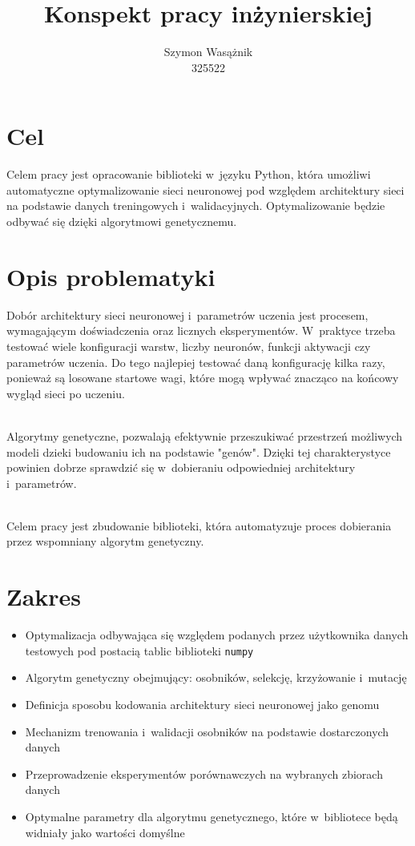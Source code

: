 \documentclass[a4paper, 11pt]{article}
\title{Konspekt pracy inżynierskiej}
\author{Szymon Wasążnik\\325522}
\date{}
\begin{document}
\maketitle
\section{Cel}
Celem pracy jest opracowanie biblioteki w~języku Python,
która umożliwi automatyczne optymalizowanie sieci neuronowej
pod względem architektury sieci na podstawie danych treningowych i~walidacyjnych.
Optymalizowanie będzie odbywać się dzięki algorytmowi genetycznemu.

\section{Opis problematyki}
Dobór architektury sieci neuronowej i~parametrów uczenia jest procesem,
wymagającym doświadczenia oraz licznych eksperymentów.
W~praktyce trzeba testować wiele konfiguracji warstw,
liczby neuronów, funkcji aktywacji czy parametrów uczenia.
Do tego najlepiej testować daną konfigurację kilka razy,
ponieważ są losowane startowe wagi,
które mogą wpływać znacząco na końcowy wygląd sieci po uczeniu.

\noindent\\
Algorytmy genetyczne, pozwalają efektywnie przeszukiwać przestrzeń możliwych modeli
dzieki budowaniu ich na podstawie "genów".
Dzięki tej charakterystyce powinien dobrze sprawdzić się w~dobieraniu odpowiedniej architektury i~parametrów.

\noindent\\
Celem pracy jest zbudowanie biblioteki,
która automatyzuje proces dobierania przez wspomniany algorytm genetyczny.

\section{Zakres}
\begin{itemize}
  \setlength{\itemsep}{0pt}
  \setlength{\parskip}{0pt}
  \item Optymalizacja odbywająca się względem podanych przez użytkownika danych testowych pod postacią tablic biblioteki \texttt{numpy}
  \item Algorytm genetyczny obejmujący: osobników, selekcję, krzyżowanie i~mutację
  \item Definicja sposobu kodowania architektury sieci neuronowej jako genomu
  \item Mechanizm trenowania i~walidacji osobników na podstawie dostarczonych danych
  \item Przeprowadzenie eksperymentów porównawczych na wybranych zbiorach danych
  \item Optymalne parametry dla algorytmu genetycznego, które w~bibliotece będą widniały jako wartości domyślne
\end{itemize}
\end{document}
